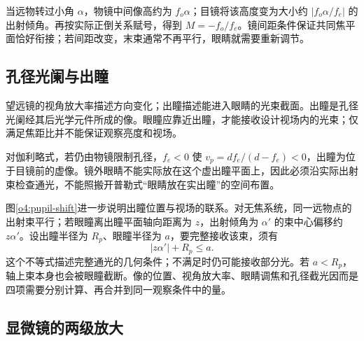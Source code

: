 当远物转过小角 $\alpha$，物镜中间像高约为 $f_o\alpha$；目镜将该高度变为大小约 $|f_o\alpha/f_e|$ 的出射倾角。再按实际正倒关系赋号，得到 $M=-f_o/f_e$。镜间距条件保证共同焦平面恰好衔接；若间距改变，末束通常不再平行，眼睛就需要重新调节。

\subsection{孔径光阑与出瞳}
望远镜的视角放大率描述方向变化；出瞳描述能进入眼睛的光束截面。出瞳是孔径光阑经其后光学元件所成的像。眼瞳应靠近出瞳，才能接收设计视场内的光束；仅满足焦距比并不能保证观察亮度和视场。



对伽利略式，若仍由物镜限制孔径，$f_e<0$ 使 $v_p=df_e/(d-f_e)<0$，出瞳为位于目镜前的虚像。镜外眼睛不能实际放在这个虚出瞳平面上，因此必须沿实际出射束检查通光，不能照搬开普勒式“眼睛放在实出瞳”的空间布置。

图\ref{o4:pupil-shift}进一步说明出瞳位置与视场的联系。对无焦系统，同一远物点的出射束平行；若眼瞳离出瞳平面轴向距离为 $z$，出射倾角为 $\alpha'$ 的束中心偏移约 $z\alpha'$。设出瞳半径为 $R_p$、眼瞳半径为 $a$，要完整接收该束，须有
\[
|z\alpha'|+R_p\le a.
\]
这个不等式描述完整通光的几何条件；不满足时仍可能接收部分光。若 $a<R_p$，轴上束本身也会被眼瞳截断。像的位置、视角放大率、眼睛调焦和孔径截光因而是四项需要分别计算、再合并到同一观察条件中的量。


\subsection{显微镜的两级放大}

